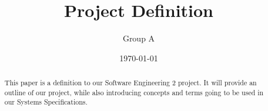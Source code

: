 \documentclass[11pt]{article}   %
\title{Project Definition\\ \epns}
\author{Group A}
\date{\today}
\begin{document}
\maketitle

\begin{abstract}
This paper is a definition to our Software Engineering 2 project. It will provide an outline of our project, while also introducing concepts and terms going to be used in our Systems Specifications.
\end{abstract}

\tableofcontents \newpage






\printindex
\end{document}
